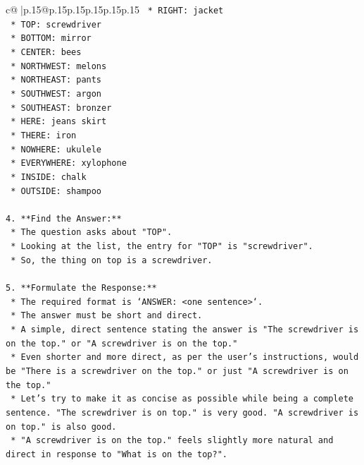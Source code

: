 \documentclass{article}
\begin{document}
{\begin{supertabular}{c@{$\;$}|p{.15\linewidth}@{}p{.15\linewidth}p{.15\linewidth}p{.15\linewidth}p{.15\linewidth}p{.15\linewidth}}
{{{\texttt{    *   RIGHT: jacket} \\
\texttt{    *   TOP: screwdriver} \\
\texttt{    *   BOTTOM: mirror} \\
\texttt{    *   CENTER: bees} \\
\texttt{    *   NORTHWEST: melons} \\
\texttt{    *   NORTHEAST: pants} \\
\texttt{    *   SOUTHWEST: argon} \\
\texttt{    *   SOUTHEAST: bronzer} \\
\texttt{    *   HERE: jeans skirt} \\
\texttt{    *   THERE: iron} \\
\texttt{    *   NOWHERE: ukulele} \\
\texttt{    *   EVERYWHERE: xylophone} \\
\texttt{    *   INSIDE: chalk} \\
\texttt{    *   OUTSIDE: shampoo} \\
\\ 
\texttt{4.  **Find the Answer:**} \\
\texttt{    *   The question asks about "TOP".} \\
\texttt{    *   Looking at the list, the entry for "TOP" is "screwdriver".} \\
\texttt{    *   So, the thing on top is a screwdriver.} \\
\\ 
\texttt{5.  **Formulate the Response:**} \\
\texttt{    *   The required format is `ANSWER: <one sentence>`.} \\
\texttt{    *   The answer must be short and direct.} \\
\texttt{    *   A simple, direct sentence stating the answer is "The screwdriver is on the top." or "A screwdriver is on the top."} \\
\texttt{    *   Even shorter and more direct, as per the user's instructions, would be "There is a screwdriver on the top." or just "A screwdriver is on the top."} \\
\texttt{    *   Let's try to make it as concise as possible while being a complete sentence. "The screwdriver is on top." is very good. "A screwdriver is on top." is also good.} \\
\texttt{    *   "A screwdriver is on the top." feels slightly more natural and direct in response to "What is on the top?".} \\
}}}
\end{supertabular}}
\end{document}
